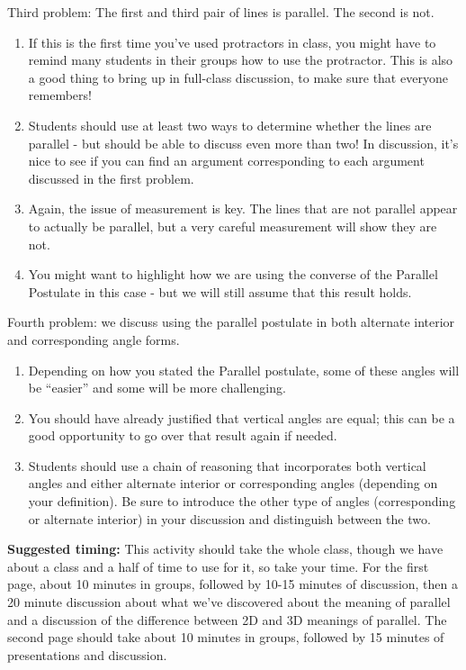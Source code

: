 \documentclass[nooutcomes,noauthor]{ximera}
\begin{document}
\begin{instructorNotes}
Third problem:  The first and third pair of lines is parallel.  The second is not.
\begin{enumerate}
\item If this is the first time you've used protractors in class, you might have to remind many students in their groups how to use the protractor.  This is also a good thing to bring up in full-class discussion, to make sure that everyone remembers!
\item Students should use at least two ways to determine whether the lines are parallel - but should be able to discuss even more than two!  In discussion, it's nice to see if you can find an argument corresponding to each argument discussed in the first problem.  
\item Again, the issue of measurement is key.  The lines that are not parallel appear to actually be parallel, but a very careful measurement will show they are not.
\item You might want to highlight how we are using the converse of the Parallel Postulate in this case - but we will still assume that this result holds.
\end{enumerate}

Fourth problem: we discuss using the parallel postulate in both alternate interior and corresponding angle forms.
\begin{enumerate}
	\item Depending on how you stated the Parallel postulate, some of these angles will be ``easier'' and some will be more challenging.
	\item You should have already justified that vertical angles are equal; this can be a good opportunity to go over that result again if needed.
	\item Students should use a chain of reasoning that incorporates both vertical angles and either alternate interior or corresponding angles (depending on your definition). Be sure to introduce the other type of angles (corresponding or alternate interior) in your discussion and distinguish between the two.
\end{enumerate}


{\bf Suggested timing:} This activity should take the whole class, though we have about a class and a half of time to use for it, so take your time.  For the first page, about 10 minutes in groups, followed by 10-15 minutes of discussion, then a 20 minute discussion about what we've discovered about the meaning of parallel and a discussion of the difference between 2D and 3D meanings of parallel.  The second page should take about 10 minutes in groups, followed by 15 minutes of presentations and discussion.

\end{instructorNotes}
\end{document}
